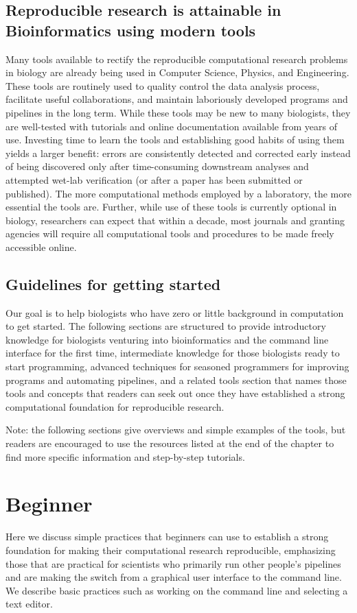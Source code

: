 \documentclass[ChapterTOCs,krantz2]{krantz} %
\begin{document}
\subsection{Reproducible research is attainable in Bioinformatics using modern tools}

Many tools available to rectify the reproducible computational research problems 
in biology are already being used in Computer Science, Physics, and
Engineering.  These
tools are routinely used to quality control the data analysis process,
facilitate useful collaborations, and maintain laboriously developed programs
and pipelines in the long term.  While these tools may be new to many
biologists, they are well-tested with tutorials and online
documentation available from years of use.  Investing time to learn the
tools and establishing good habits of using them yields a larger benefit:
errors are consistently detected and corrected early instead of being
discovered only after time-consuming downstream analyses and attempted wet-lab
verification (or after a paper has been submitted or published).  The more
computational methods employed by a laboratory, the more essential the tools
are.  Further, while 
use of these tools is currently optional in biology, researchers can 
expect that within a decade, most journals and granting agencies will 
require all computational tools and procedures to be made freely accessible online.

\subsection{Guidelines for getting started} Our goal is to help biologists who
have zero or little background in computation to
get started. The following sections are structured to provide
introductory knowledge for biologists venturing into bioinformatics and the
command line interface for the first time, intermediate knowledge for those
biologists ready to start programming, advanced techniques for seasoned
programmers for improving programs and automating pipelines, and a related tools
section that names those tools and concepts that readers can seek out once they
have established a strong computational foundation for reproducible research.

Note: the following sections give overviews and simple examples of the tools, 
but readers are encouraged to use the resources listed at the end of
the chapter to find more specific information and step-by-step tutorials.

\section{Beginner} Here we discuss simple practices that beginners can use
to establish a strong foundation for making their computational research
reproducible, emphasizing those that are practical for scientists who primarily
run other people's pipelines and are making the switch from a graphical user
interface to the command line. We describe basic practices such as working
on the command line and selecting a text editor.  
\end{document}

